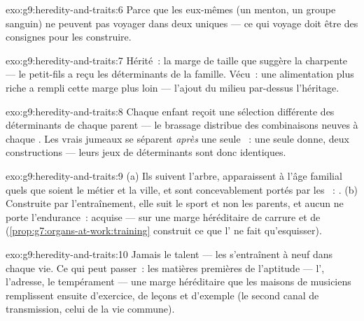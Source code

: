 \begin{solution}{exo:g9:heredity-and-traits:6}
Parce que les  eux-mêmes (un menton, un groupe
sanguin) ne peuvent pas voyager dans deux  uniques
--- ce qui voyage doit être des consignes pour les
construire.
\end{solution}

\begin{solution}{exo:g9:heredity-and-traits:7}
Hérité~: la marge de taille que suggère la charpente --- le
petit-fils a reçu les déterminants de la famille. Vécu~:
une alimentation plus riche a rempli cette marge plus loin
--- l'ajout du milieu par-dessus l'héritage.
\end{solution}

\begin{solution}{exo:g9:heredity-and-traits:8}
Chaque enfant reçoit une sélection différente des
déterminants de chaque parent --- le brassage distribue des
combinaisons neuves à chaque . Les vrais jumeaux
se séparent \emph{après} une seule ~: une seule
donne, deux constructions --- leurs jeux de déterminants
sont donc identiques.
\end{solution}

\begin{solution}{exo:g9:heredity-and-traits:9}
(a) Ils suivent l'arbre, apparaissent à l'âge familial quels
que soient le métier et la ville, et sont concevablement
portés par les ~: . (b) Construite par
l'entraînement, elle suit le sport et non les parents, et
aucun  ne porte l'endurance~: acquise --- sur une
marge héréditaire de carrure et de 
(\cref{prop:g7:organs-at-work:training} construit ce que
l' ne fait qu'esquisser).
\end{solution}

\begin{solution}{exo:g9:heredity-and-traits:10}
Jamais le talent --- les  s'entraînent à neuf dans
chaque vie. Ce qui peut passer~: les matières premières de
l'aptitude --- l', l'adresse, le tempérament --- une
marge héréditaire que les maisons de musiciens remplissent
ensuite d'exercice, de leçons et d'exemple (le second
canal de transmission, celui de la vie commune).
\end{solution}

